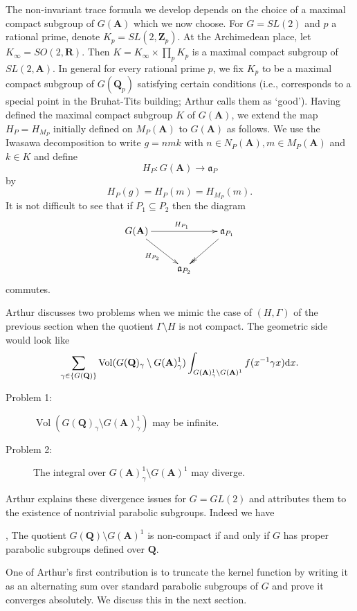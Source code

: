 \documentclass{ims9x6}
\def\A{\mathbf A}
\def\Q{\mathbf Q}
\def\R{\mathbf R}
\def\Z{\mathbf Z}
\def\aaa{\mathfrak a}
\def\d{\text d}
\def\bs{\setminus}
\def\vol{\operatorname{Vol}}
\begin{document}
The non-invariant trace formula we develop depends on the choice of a maximal compact subgroup of $G(\A)$ which we now choose. For $G = SL(2)$ and $p$ a rational prime, denote $K_p = SL(2, \Z_p)$. At the Archimedean place, let $K_\infty = SO(2, \R)$. Then $K = K_\infty \times \prod_p K_p$ is a maximal compact subgroup of $SL(2, \A)$. In general for every rational prime $p$, we fix $K_p$ to be a maximal compact subgroup of $G(\Q_p)$ satisfying certain conditions (i.e., corresponds to a special point in the Bruhat-Tits building; Arthur calls them as `good'). Having defined the maximal compact subgroup $K$ of $G(\A)$, we extend the map $H_P = H_{M_P}$ initially defined on $M_P(\A)$ to $G(\A)$ as follows. We use the Iwasawa decomposition to write $g = nmk$ with $n \in N_P(\A), m \in M_P(\A)$ and $k \in K$ and define
\[ H_P : G(\A) \to \aaa_P \]
by 
\[ H_P(g) = H_P(m) = H_{M_P}(m). \]
It is not difficult to see that if $P_1 \subseteq P_2$ then the diagram 
\[ \xymatrix{ 
	G(\A) \ar[rr]^{H_{P_1}} \ar[dr]_{H_{P_2}} & & \aaa_{P_1} \ar@{->>}[dl] \\ & \aaa_{P_2} & 
	}
\]
commutes.

Arthur discusses two problems when we mimic the case of $(H, \Gamma)$ of the previous section when the quotient $\Gamma\bs H$ is not compact. The geometric side would look like 
\[ \sum_{\gamma \in \{G(\Q)\}} \vol(G(\Q)_\gamma\bs G(\A)_\gamma^1) \int_{G(\A)^1_\gamma \bs G(\A)^1} f(x^{-1}\gamma x) \d x.\]

\begin{description}
\item[Problem 1:] $\vol(G(\Q)_\gamma\bs G(\A)_\gamma^1)$ may be infinite. 
\item[Problem 2:] The integral over $G(\A)^1_\gamma \bs G(\A)^1$ may diverge. 
\end{description}

Arthur explains these divergence issues for $G = GL(2)$ and attributes them to the existence of nontrivial parabolic subgroups. Indeed we have

\begin{theorem} \cite[Theorem~9.4]{MR147566}, \cite{MR141672}
The quotient $G(\Q)\bs G(\A)^1$ is non-compact if and only if $G$ has proper parabolic subgroups defined over $\Q$. 
\end{theorem}

One of Arthur's first contribution is to truncate the kernel function by writing it as an alternating sum over standard parabolic subgroups of $G$ and prove it converges absolutely. We discuss this in the next section. 
\end{document}
